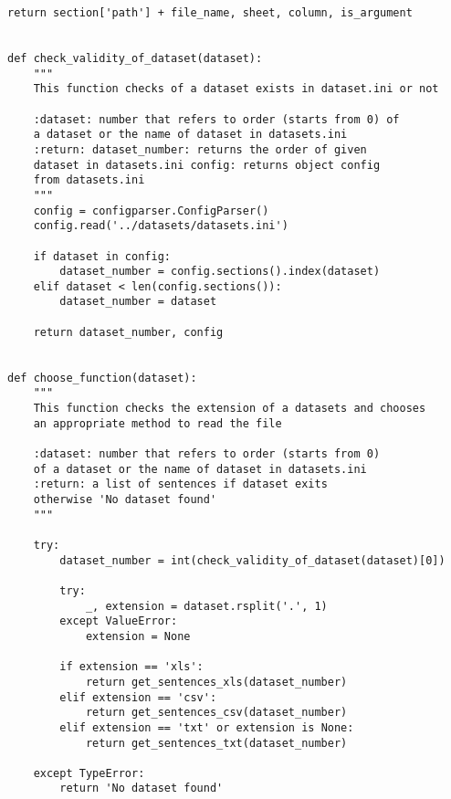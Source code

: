 \begin{lstlisting}[language=iPython]
	return section['path'] + file_name, sheet, column, is_argument


def check_validity_of_dataset(dataset):
	"""
	This function checks of a dataset exists in dataset.ini or not
	
	:dataset: number that refers to order (starts from 0) of 
	a dataset or the name of dataset in datasets.ini
	:return: dataset_number: returns the order of given 
	dataset in datasets.ini	config: returns object config 
	from datasets.ini
	"""
	config = configparser.ConfigParser()
	config.read('../datasets/datasets.ini')
	
	if dataset in config:
		dataset_number = config.sections().index(dataset)
	elif dataset < len(config.sections()):
		dataset_number = dataset
	
	return dataset_number, config


def choose_function(dataset):
	"""
	This function checks the extension of a datasets and chooses 
	an appropriate method to read the file
	
	:dataset: number that refers to order (starts from 0) 
	of a dataset or the name of dataset in datasets.ini
	:return: a list of sentences if dataset exits 
	otherwise 'No dataset found'
	"""
	
	try:
		dataset_number = int(check_validity_of_dataset(dataset)[0])
		
		try:
			_, extension = dataset.rsplit('.', 1)
		except ValueError:
			extension = None
			
		if extension == 'xls':
			return get_sentences_xls(dataset_number)
		elif extension == 'csv':
			return get_sentences_csv(dataset_number)
		elif extension == 'txt' or extension is None:
			return get_sentences_txt(dataset_number)
		
	except TypeError:
		return 'No dataset found'

\end{lstlisting}
